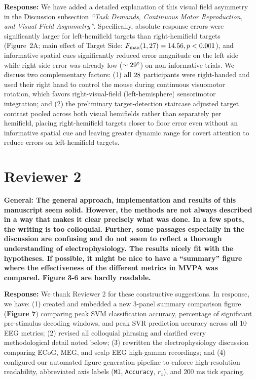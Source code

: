 \documentclass[11pt]{article}
\newcommand{\revcomment}[1]{\vspace{6pt}\noindent\textbf{\textcolor{commentgray}{#1}}\par\vspace{2pt}}
\newcommand{\authorresp}[1]{\noindent\textcolor{revblue}{\textbf{Response:}} #1\par\vspace{6pt}}
\begin{document}
\authorresp{We have added a detailed explanation of this visual field asymmetry in the Discussion subsection \textit{``Task Demands, Continuous Motor Reproduction, and Visual Field Asymmetry''}. Specifically, absolute response errors were significantly larger for left-hemifield targets than right-hemifield targets (Figure~2A; main effect of Target Side: $F_{\max}(1,27{}) = 14.56{}, p < 0.001{}$), and informative spatial cues significantly reduced error magnitude on the left side while right-side error was already low ($\sim 29^\circ{}$) on non-informative trials. We discuss two complementary factors: (1) all $28{}$ participants were right-handed and used their right hand to control the mouse during continuous visuomotor rotation, which favors right-visual-field (left-hemisphere) sensorimotor integration; and (2) the preliminary target-detection staircase adjusted target contrast pooled across both visual hemifields rather than separately per hemifield, placing right-hemifield targets closer to floor error even without an informative spatial cue and leaving greater dynamic range for covert attention to reduce errors on left-hemifield targets.}

\section*{Reviewer 2}

\revcomment{General: The general approach, implementation and results of this manuscript seem solid. However, the methods are not always described in a way that makes it clear precisely what was done. In a few spots, the writing is too colloquial. Further, some passages especially in the discussion are confusing and do not seem to reflect a thorough understanding of electrophysiology. The results nicely fit with the hypotheses. If possible, it might be nice to have a ``summary'' figure where the effectiveness of the different metrics in MVPA was compared. Figure 3-6 are hardly readable.}

\authorresp{We thank Reviewer 2 for these constructive suggestions. In response, we have: (1) created and embedded a new 3-panel summary comparison figure (\textbf{Figure 7}) comparing peak SVM classification accuracy, percentage of significant pre-stimulus decoding windows, and peak SVR prediction accuracy across all 10 EEG metrics; (2) revised all colloquial phrasing and clarified every methodological detail noted below; (3) rewritten the electrophysiology discussion comparing ECoG, MEG, and scalp EEG high-gamma recordings; and (4) configured our automated figure generation pipeline to enforce high-resolution readability, abbreviated axis labels (\texttt{MI}, \texttt{Accuracy}, $r_z$), and $200\text{ ms}$ tick spacing.}
\end{document}
